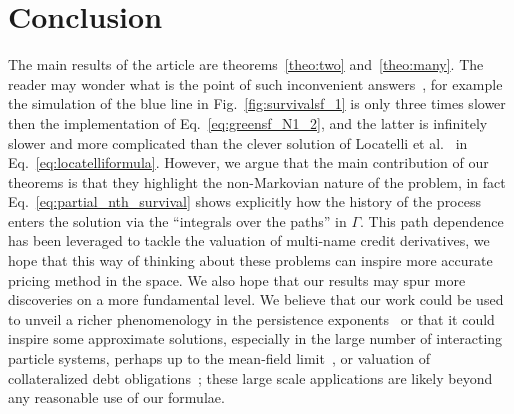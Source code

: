 \documentclass[a4paper,11pt]{amsart}
\theoremstyle{remark}
\begin{document}
 \section{Conclusion}
 The main results of the article are theorems~\ref{theo:two} and~\ref{theo:many}. The reader may wonder what is the point of such inconvenient answers~\cite{wilf_what_1982}, for example the simulation of the blue line in Fig.~\ref{fig:survivalsf_1} is only three times slower then the implementation of Eq.~\eqref{eq:greensf_N1_2}, and the latter is infinitely slower and more complicated than the clever solution of Locatelli et al.~\cite{locatelli_active_2015} in Eq.~\eqref{eq:locatelliformula}. However, we argue that the main contribution of our theorems is that they highlight the non-Markovian nature of the problem, in fact Eq.~\eqref{eq:partial_nth_survival} shows explicitly how the history of the process enters the solution via the ``integrals over the paths'' in $\Gamma$. This path dependence has been leveraged to tackle the valuation of multi-name credit derivatives, we hope that this way of thinking about these problems can inspire more accurate pricing method in the space. We also hope that our results may spur more discoveries on a more fundamental level. We believe that our work could be used to unveil a richer phenomenology in the persistence exponents~\cite{bray_persistence_2013,andersen_persistence_2015}  or that it could inspire some approximate solutions, especially in the large number of interacting particle systems, perhaps up to the mean-field limit~\cite{guo_mean-field_2023}, or valuation of collateralized debt obligations~\cite{hull_valuation_2004, laurent_basket_2005}; these large scale applications are likely beyond any reasonable use of our formulae.
 
 
  
\end{document}
